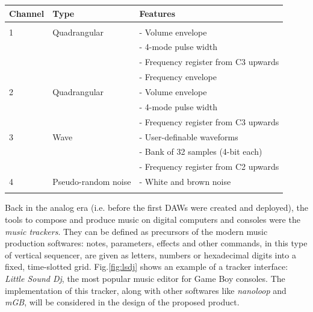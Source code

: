 \documentclass[]{article}
\begin{document}
        \def\arraystretch{1.2}
        \begin{tabular}{l l l}
            \hline
            \textbf{Channel} & \textbf{Type} & \textbf{Features}\\
            \hline \\[-6pt]
            1 & Quadrangular\footnotemark & - Volume envelope\\
                &   &                                                                          - 4-mode pulse width\\
                &   &                                                                          - Frequency register from C3 upwards\\
                &   &                                                                          - Frequency envelope\\            
            \hline
            2 & Quadrangular & - Volume envelope\\       
            &   &              - 4-mode pulse width\\
            &   &              - Frequency register from C3 upwards\\
            \hline
            3 & Wave & - User-definable waveforms\\
            &   &      - Bank of 32 samples (4-bit each)\\
            &   &      - Frequency register from C2 upwards\\
            \hline
            4 & Pseudo-random noise & - White and brown noise\\
            \hline \\
        \end{tabular}
        
        \nocite{MARQUEZ2014}

        Back in the analog era (i.e. before the first DAWs were created and deployed), the tools to compose and produce music on digital 
        computers and consoles were the \emph{music trackers}. They can be defined as precursors of the modern 
        music production softwares: notes, parameters, effects and other commands, in this type of vertical sequencer, are given
        as letters, numbers or hexadecimal digits into a fixed, time-slotted grid. Fig.\ref{fig:lsdj} shows an
        example of a tracker interface: \emph{Little Sound Dj}, the most popular music editor for 
        Game Boy consoles. The implementation of this tracker, along with other softwares like \emph{nanoloop} 
        and \emph{mGB}, will be considered in the design of the proposed product. \\
\end{document}
